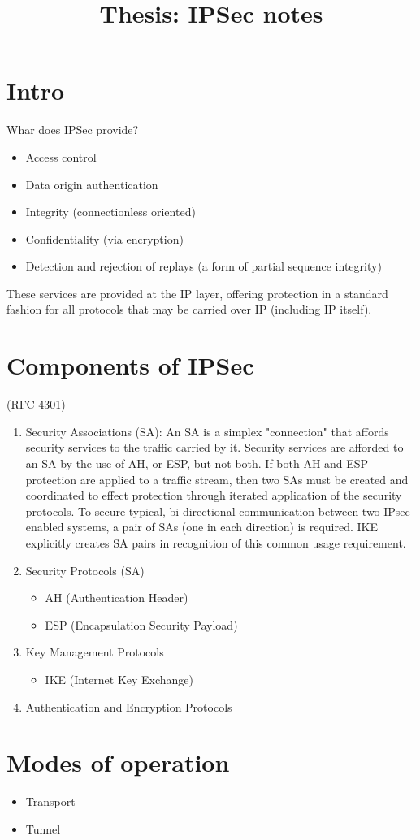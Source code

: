 \documentclass[11pt]{article}
\begin{document}
\title{Thesis: IPSec notes}
\author{}
\date{}
\maketitle
\section{Intro}
Whar does IPSec provide?
\begin{itemize}
\item Access control
\item Data origin authentication
\item Integrity (connectionless oriented)
\item Confidentiality (via encryption)
\item Detection and rejection of replays (a form of partial sequence integrity)
\end{itemize}
These services are provided at the IP layer, offering protection in a standard fashion for all protocols that may be carried over IP (including IP itself).

\section{Components of IPSec} (RFC 4301)
\begin{enumerate}
\item Security Associations (SA): An SA is a simplex "connection" that affords security services to the traffic carried by it.  Security services are afforded to an SA by the use of AH, or ESP, but not both.  If both AH and ESP protection are applied to a traffic stream, then two SAs must be created and coordinated to effect protection through iterated application of the security protocols.  To secure typical, bi-directional communication between two IPsec-enabled systems, a pair of SAs (one in each direction) is required.  IKE explicitly creates SA pairs in recognition of this common usage requirement.
\item Security Protocols (SA)
	\begin{itemize}
	\item AH (Authentication Header)
	\item ESP (Encapsulation Security Payload)
	\end{itemize}
\item Key Management Protocols
	\begin{itemize}
	\item IKE (Internet  Key  Exchange) 
	\end{itemize}
\item Authentication and Encryption Protocols
\end{enumerate}

\section{Modes of operation}
\begin{itemize}
\item Transport
\item Tunnel
\end{itemize}
\end{document}

